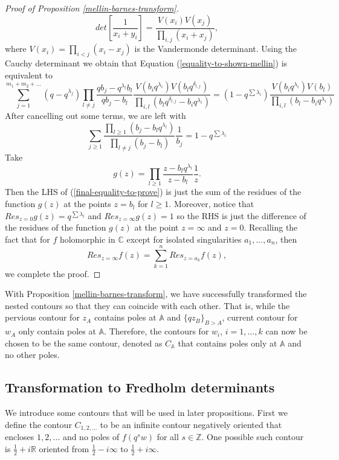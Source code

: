 \begin{proof}[Proof of Proposition \ref{mellin-barnes-transform}]
$$det\left[ \frac{1}{x_i + y_i} \right] = \frac{V(x_i) V(x_j)}{\prod_{i,j} (x_i + x_j)},$$ where $V(x_i) = \prod_{i<j} (x_i - x_j)$ is the Vandermonde determinant. Using the Cauchy determinant we obtain that Equation (\ref{equality-to-shown-mellin}) is equivalent to
$$ \sum_{j=1}^{m_1 + m_2 + \dots} (q - q^{\lambda_j}) \prod_{l \neq j} \frac{qb_j - q^{\lambda_l} b_l}{qb_j - b_l} \frac{V(b_i q^{\lambda_i}) V(b_l q^{\delta_{l,j}})}{\prod_{i,l} (b_l q^{\delta_{l,j}} - b_i q^{\lambda_i})} = (1-q^{ \sum \lambda_i }) \frac{V(b_i q^{\lambda_i}) V(b_l)}{\prod_{i,l} (b_l - b_i q^{\lambda_i})}$$
After cancelling out some terms, we are left with 
\begin{equation}
\label{final-equality-to-prove}
\sum_{j \ge 1} \frac{\prod_{l \ge 1} (b_j - b_l q^{\lambda_l})}{\prod_{l \neq j} (b_j - b_l)} \frac{1}{b_j} = 1 - q^{\sum \lambda_i}
\end{equation}
Take $$g(z) = \prod_{l \ge 1} \frac{z - b_l q^{\lambda_l}}{z - b_l} \frac{1}{z}.$$ Then the LHS of (\ref{final-equality-to-prove}) is just the sum of the residues of the function $g(z)$ at the points $z = b_l$ for $l \ge 1$. Moreover, notice that $Res_{z = 0} g(z) = q^{\sum \lambda_l}$ and $Res_{z = \infty} g(z) = 1$ so the RHS is just the difference of the residues of the function $g(z)$ at the point $z = \infty$ and $z = 0$. Recalling the fact that for $f$ holomorphic in $\mathbb{C}$ except for isolated singularities $a_1, \dots, a_n$, then $$Res_{z = \infty} f(z) = \sum_{k = 1}^{n} Res_{z = a_k} f(z),$$ we complete the proof.
\end{proof}

With Proposition \ref{mellin-barnes-transform}, we have successfully transformed the nested contours so that they can coincide with each other. That is, while the pervious contour for $z_A$ contains poles at $\mathbb{A}$ and $\{qz_B\}_{B>A}$, current contour for $w_A$ only contain poles at $\mathbb{A}$. Therefore, the contours for $w_i$, $i = 1, \dots, k$ can now be chosen to be the same contour, denoted as $C_{\mathbb{A}}$ that contains poles only at $\mathbb{A}$ and no other poles. 

\subsection{Transformation to Fredholm determinants}
\label{transformation-to-fd}
We introduce some contours that will be used in later propositions. First we define the contour $C_{1,2,\dots}$ to be an infinite contour negatively oriented that encloses $1,2,\dots$ and no poles of $f(q^sw)$ for all $s \in \mathbb{Z}$. One possible such contour is $\frac{1}{2} + i\mathbb{R}$ oriented from $\frac{1}{2} - i\infty$ to $\frac{1}{2} + i\infty$. 


